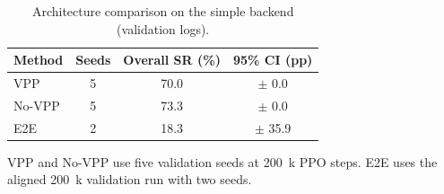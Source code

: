 \begin{table}[t]
\centering
\caption{Architecture comparison on the simple backend (validation logs).}
\label{tab:architecture_comparison_exact}
\begin{tabular}{lccc}
\toprule
Method & Seeds & Overall SR (\%) & 95\% CI (pp) \\
\midrule
VPP & 5 & 70.0 & $\pm$ 0.0 \\
No-VPP & 5 & 73.3 & $\pm$ 0.0 \\
E2E & 2 & 18.3 & $\pm$ 35.9 \\
\bottomrule
\end{tabular}
\begin{tablenotes}
\small
\item VPP and No-VPP use five validation seeds at 200~k PPO steps. E2E uses the aligned 200~k validation run with two seeds.
\end{tablenotes}
\end{table}